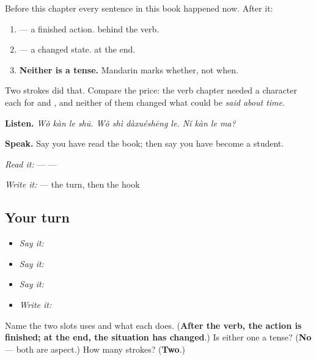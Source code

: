 \begin{grammarlens}[title={What you've built — two strokes, and time itself}]
Before this chapter every sentence in this book happened now. After it:

\begin{enumerate}
\raggedright
  \item \textbf{} — a finished action.  behind the verb.
  \item \textbf{} — a changed state.  at the end.
  \item \textbf{Neither is a tense.} Mandarin marks whether, not when.
\end{enumerate}

Two strokes did that. Compare the price: the verb chapter needed a character each for  and , and neither of them changed what could be \emph{said about time}.

\textbf{Listen.} \emph{Wǒ kàn le shū. Wǒ shì dàxuéshēng le. Nǐ kàn le ma?}

\textbf{Speak.} Say you have read the book; then say you have become a student.

\emph{Read it:}  —  — 

\emph{Write it:}  — the turn, then the hook
\end{grammarlens}

\subsection*{Your turn}
\begin{itemize}
\raggedright
  \item \emph{Say it:} 
  \item \emph{Say it:} 
  \item \emph{Say it:} 
  \item \emph{Write it:} 
\end{itemize}

\begin{tcolorbox}[breakable,colback=teal!4,colframe=teal!35!black,title={Before you move on}]
Name the two slots  uses and what each does. (\textbf{After the verb, the action is finished; at the end, the situation has changed}.) Is either one a tense? (\textbf{No} — both are aspect.) How many strokes? (\textbf{Two}.)
\end{tcolorbox}
